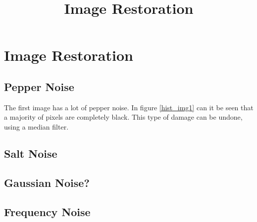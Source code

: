 \documentclass[12pt,a4paper]{article}
\begin{document}
\title{Image Restoration}
\maketitle

\pagebreak


\section{Image Restoration}



\subsection{Pepper Noise}
The first image has a lot of pepper noise.
In figure \ref{hist_img1} can it be seen that a majority of pixels are completely black.
This type of damage can be undone, using a median filter.


\subsection{Salt Noise}


\subsection{Gaussian Noise?}


\subsection{Frequency Noise}
\end{document}
